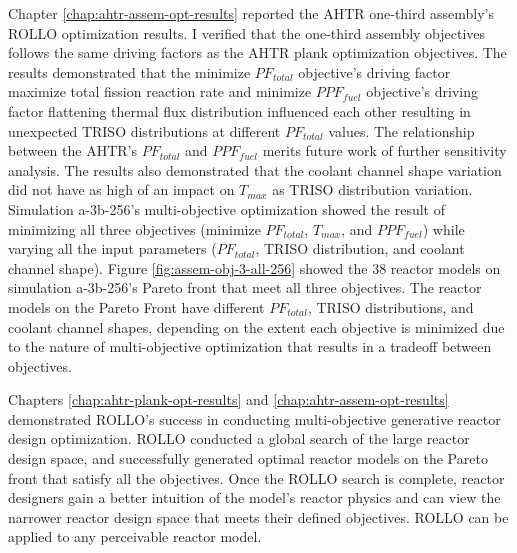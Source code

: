 Chapter \ref{chap:ahtr-assem-opt-results} reported the \gls{AHTR} one-third assembly's
\gls{ROLLO} optimization results.
I verified that the one-third assembly objectives follows the same driving 
factors as the \gls{AHTR} plank optimization objectives. 
The results demonstrated that the minimize $PF_{total}$ objective's driving factor 
maximize total fission reaction rate and minimize $PPF_{fuel}$ objective's driving 
factor flattening thermal flux distribution influenced each other resulting in unexpected 
TRISO distributions at different $PF_{total}$ values. 
The relationship between the \gls{AHTR}'s $PF_{total}$ and $PPF_{fuel}$ 
merits future work of further sensitivity analysis. 
The results also demonstrated that the coolant channel shape variation did 
not have as high of an impact on $T_{max}$ as \gls{TRISO} distribution variation.
Simulation a-3b-256's multi-objective optimization showed the result of minimizing all 
three objectives (minimize $PF_{total}$, $T_{max}$, and $PPF_{fuel}$) while varying 
all the input parameters ($PF_{total}$, TRISO distribution, and coolant channel shape).
Figure \ref{fig:assem-obj-3-all-256} showed the 38 reactor models on simulation 
a-3b-256's Pareto front that meet all three objectives. 
The reactor models on the Pareto Front have different $PF_{total}$, TRISO distributions, 
and coolant channel shapes, depending on the extent each objective is minimized due 
to the nature of multi-objective optimization that results in a tradeoff between 
objectives. 

Chapters \ref{chap:ahtr-plank-opt-results} and \ref{chap:ahtr-assem-opt-results} 
demonstrated \gls{ROLLO}'s success in conducting multi-objective generative reactor 
design optimization. 
\gls{ROLLO} conducted a global search of the large reactor design space, and successfully 
generated optimal reactor models on the Pareto front that satisfy all the objectives. 
Once the \gls{ROLLO} search is complete, reactor designers gain a better intuition of 
the model's reactor physics and can view the narrower reactor design space that meets 
their defined objectives. 
\gls{ROLLO} can be applied to any perceivable reactor model.  



